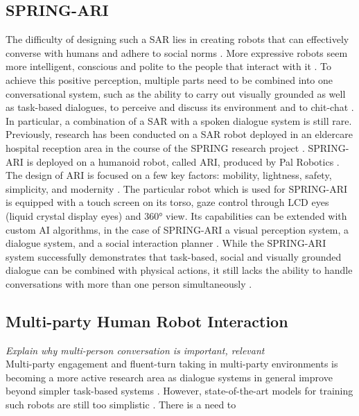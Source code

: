 \documentclass[11pt]{article}
\begin{document}
\subsection{SPRING-ARI}
\label{subsec:spring_ari}
The difficulty of designing such a SAR lies in creating robots that can effectively converse with humans and adhere to social norms \cite{moujahid_multi_party_2022}. More expressive robots seem more intelligent, conscious and polite to the people that interact with it \cite{moujahid_multi_party_2022}. To achieve this positive perception, multiple parts need to be combined into one conversational system, such as the ability to carry out visually grounded as well as task-based dialogues, to perceive and discuss its environment and to chit-chat \cite{gunson_visually_aware_2022}. In particular, a combination of a SAR with a spoken dialogue system is still rare. Previously, research has been conducted on a SAR robot deployed in an eldercare hospital reception area in the course of the SPRING research project \cite{addlesee_comprehensive_2020}. SPRING-ARI is deployed on a humanoid robot, called ARI, produced by Pal Robotics \cite{palrobot}. The design of ARI is focused on a few key factors: mobility, lightness, safety, simplicity, and modernity \cite{cooper_ari_2020}. The particular robot which is used for SPRING-ARI is equipped with a touch screen on its torso, gaze control through LCD eyes (liquid crystal display eyes) and 360° view. Its capabilities can be extended with custom AI algorithms, in the case of SPRING-ARI a visual perception system, a dialogue system, and a social interaction planner \cite{addlesee_comprehensive_2020}. While the SPRING-ARI system successfully demonstrates that task-based, social and visually grounded dialogue can be combined with physical actions, it still lacks the ability to handle conversations with more than one person simultaneously \cite{addlesee_comprehensive_2020}. 

\subsection{Multi-party Human Robot Interaction}
\label{subsec:multi_party}
\textit{Explain why multi-person conversation is important, relevant} \\
Multi-party engagement and fluent-turn taking in multi-party environments is becoming a more active research area as dialogue systems in general improve beyond simpler task-based systems \cite{skantze_turn_taking_2021}. However, state-of-the-art models for training such robots are still too simplistic \cite{skantze_turn_taking_2021}. There is a need to 
\end{document}
